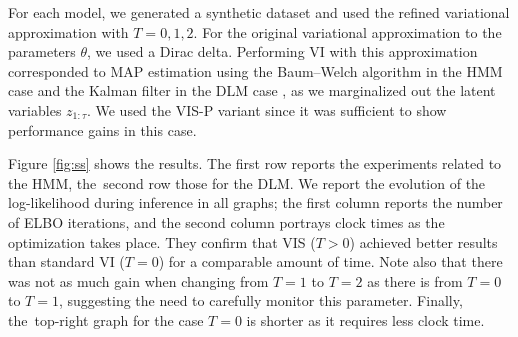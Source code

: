  For each model, we generated a synthetic dataset and used the refined variational approximation with $T = 0, 1, 2$. For the original variational approximation to the parameters $\theta$, we used a Dirac delta. Performing VI with this approximation corresponded to MAP estimation using 
 the Baum--Welch algorithm in the HMM case \cite{rabiner1989tutorial} and
 the Kalman filter in the DLM case \cite{zarchan2013fundamentals},
  as we marginalized out the latent variables $z_{1:\tau}$. We used the VIS-P variant since it was sufficient  to show performance gains in this case.%
 
 Figure \ref{fig:ss} shows the results. The first row reports the experiments related to the HMM, the~second row those for the DLM. We report the evolution of the log-likelihood during inference  in all graphs; the first column reports the number of ELBO iterations, and the second column portrays 
 clock times as the optimization takes place. They confirm that VIS ($T>0$) achieved better results than standard VI ($T=0$) for a comparable amount of time. {Note also  that there was not as much gain when changing from $T=1$ to $T=2$ as there is from $T=0$ to $T=1$, suggesting the need to carefully 
 monitor this parameter. Finally, the~top-right graph for the case $T=0$ is shorter as it requires less clock time.}
 


